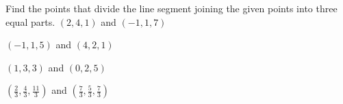 

\begin{Exercise}[
name={},
title={}, 
difficulty=0,
origin={\cite{SM}}]
Find the points that divide the line segment joining the given points into three equal parts.
\Question $(2,4,1)$ and $(-1,1,7)$

\Question $(-1,1,5)$ and $(4,2,1)$
\end{Exercise}

\begin{Answer}
\Question $(1,3,3)$ and $(0,2,5)$

\Question $\left(\frac{2}{3},\frac{4}{3},\frac{11}{3}\right)$ and $\left(\frac{7}{3},\frac{5}{3},\frac{7}{3}\right)$
\end{Answer}
